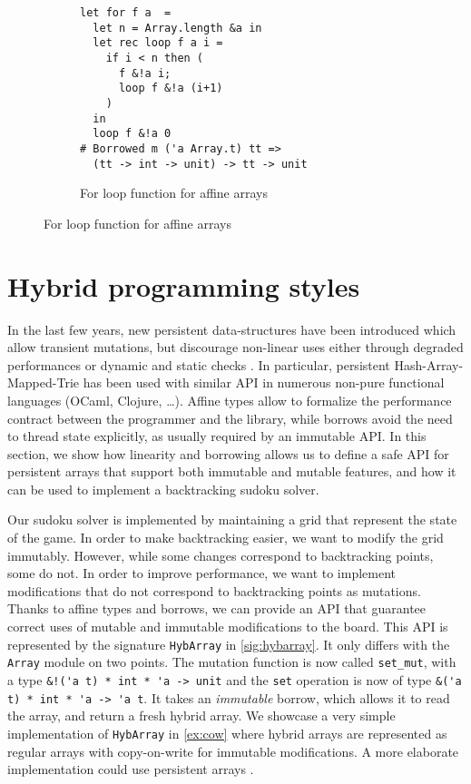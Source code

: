\begin{figure}
  \centering
  \begin{subfigure}{0.5\linewidth}
\begin{lstlisting}
let for f a  = 
  let n = Array.length &a in
  let rec loop f a i = 
    if i < n then (
      f &!a i;
      loop f &!a (i+1)
    )
  in
  loop f &!a 0
# Borrowed m ('a Array.t) tt =>
  (tt -> int -> unit) -> tt -> unit
\end{lstlisting}
    \caption{For loop function for affine arrays}
    \label{ex:array}
  \end{subfigure}
\end{figure}

\section{Hybrid programming styles}


In the last few years, new persistent data-structures
have been introduced which allow transient mutations, but discourage
non-linear uses either through degraded performances
\cite{DBLP:conf/ml/ConchonF07} or
dynamic and static checks \cite{DBLP:journals/pacmpl/Puente17}.
In particular, persistent Hash-Array-Mapped-Trie has been used with similar
API in numerous non-pure functional languages (OCaml, Clojure, \dots).
Affine types allow to formalize the performance contract between the programmer
and the library, while borrows avoid the need to thread state explicitly,
as usually required by an immutable API.
%
In this section, we show how linearity and borrowing allows us to define
a safe API for persistent arrays that support both immutable and mutable features,
and how it can be used to implement a backtracking sudoku solver.

Our sudoku solver is implemented by maintaining a grid that represent the state of the game. In order to make backtracking easier, we want to modify the grid immutably. However, while some changes correspond to backtracking points,
some do not.
In order to improve performance, we want to implement modifications
that do not correspond to backtracking points as mutations.
Thanks to affine types and borrows, we can provide an API that guarantee correct
uses of mutable and immutable modifications to the board.
This API is represented by the signature \lstinline/HybArray/ in \cref{sig:hybarray}.
It only differs with the \lstinline/Array/ module on two points.
The mutation function is now called \lstinline/set_mut/, with
a type \lstinline/&!('a t) * int * 'a -> unit/ and
the \lstinline/set/ operation
is now of type \lstinline/&('a t) * int * 'a -> 'a t/. It
takes an \emph{immutable} borrow, which allows it to read the array, and
return a fresh hybrid array.
We showcase a very simple implementation of \lstinline/HybArray/ in
\cref{ex:cow} where hybrid arrays are represented
as regular arrays with copy-on-write for immutable
modifications.
A more elaborate implementation could use persistent arrays
\cite{DBLP:conf/ml/ConchonF07}.


